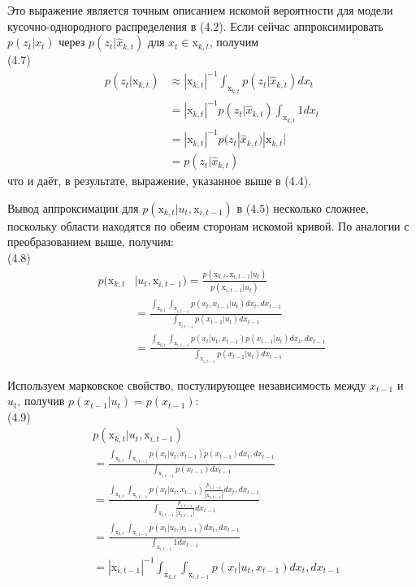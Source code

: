 \documentclass[10pt,a4paper]{article}
\begin{document}
Это выражение является точным описанием искомой вероятности для модели кусочно-однородного распределения в (4.2). Если сейчас аппроксимировать $p(z_t |
x_t)$ через $p(z_t | \hat{x}_{k,t})$ для $x_t\in \text{x}_{k,t}$, получим\\

(4.7)
\begin{equation*}
\begin{split}
p(z_t|\text{x}_{k,t})&\approx|\text{x}_{k,t}|^{-1}\int_{\text{x}_{k,t}}p(z_t|\hat{x}_{k,t})dx_t\\
&=|\text{x}_{k,t}|^{-1}p(z_t|\hat{x}_{k,t})\int_{\text{x}_{k,t}}1dx_t\\
&=|\text{x}_{k,t}|^{-1}p(z_t|\hat{x}_{k,t})|\text{x}_{k,t}|\\
&=p(z_t|\hat{x}_{k,t})
\end{split}
\end{equation*}
что и даёт, в результате, выражение, указанное выше в (4.4).

Вывод аппроксимации для $p(\text{x}_{k,t} | u_t, \text{x}_{i,t-1})$ в (4.5) несколько сложнее, поскольку области находятся по обеим сторонам искомой кривой. По аналогии с преобразованием выше, получим:\\

(4.8)
\begin{equation*}
\begin{split}
p(\text{x}_{k,t}&|u_t,\text{x}_{i,t-1})=\frac{p(\text{x}_{k,t},\text{x}_{i,t-1}|u_t)}{p(\text{x}_{i,t-1}|u_t)}\\
&=\frac{\int_{\text{x}_{k,t}}\int_{\text{x}_{i,t-1}}p(x_t,x_{t-1}|u_t)dx_t,dx_{t-1}}{\int_{\text{x}_{i,t-1}}p(x_{t-1}|u_t)dx_{t-1}}\\
&=\frac{\int_{\text{x}_{k,t}}\int_{\text{x}_{i,t-1}}p(x_t|u_t,x_{t-1})p(x_{t-1}|u_t)dx_t,dx_{t-1}}{\int_{\text{x}_{i,t-1}}p(x_{t-1}|u_t)dx_{t-1}}
\end{split}
\end{equation*}

Используем марковское свойство, постулирующее независимость между $x_{t-1}$ и $u_t$, получив $p(x_{t-1}|u_t)=p(x_{t-1})$:\\

(4.9)
\begin{equation*}
\begin{split}
&p(\text{x}_{k,t}|u_t,\text{x}_{i,t-1})\\
&=\frac{\int_{\text{x}_{k,t}}\int_{\text{x}_{i,t-1}}p(x_t|u_t,x_{t-1})p(x_{t-1})dx_t,dx_{t-1}}{\int_{\text{x}_{i,t-1}}p(x_{t-1})dx_{t-1}}\\
&=\frac{\int_{\text{x}_{k,t}}\int_{\text{x}_{i,t-1}}p(x_t|u_t,x_{t-1})\frac{p_{i,t-1}}{|\text{x}_{i,t-1}|}dx_t,dx_{t-1}}{\int_{\text{x}_{i,t-1}}\frac{p_{i,t-1}}{|\text{x}_{i,t-1}|}dx_{t-1}}\\
&=\frac{\int_{\text{x}_{k,t}}\int_{\text{x}_{i,t-1}}p(x_t|u_t,x_{t-1})dx_t,dx_{t-1}}{\int_{\text{x}_{i,t-1}}1dx_{t-1}}\\
&=|\text{x}_{i,t-1}|^{-1}\int_{\text{x}_{k,t}}\int_{\text{x}_{i,t-1}}p(x_t|u_t,x_{t-1})dx_t,dx_{t-1}
\end{split}
\end{equation*}
\end{document}
